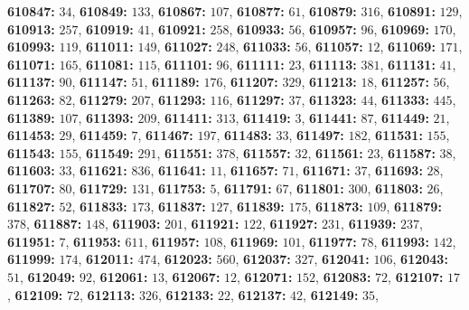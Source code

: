 \textsf{\bfseries 610847:} $34$, \textsf{\bfseries 610849:} $133$, \textsf{\bfseries 610867:} $107$, \textsf{\bfseries 610877:} $61$, \textsf{\bfseries 610879:} $316$, \textsf{\bfseries 610891:} $129$, \textsf{\bfseries 610913:} $257$, \textsf{\bfseries 610919:} $41$, \textsf{\bfseries 610921:} $258$, \textsf{\bfseries 610933:} $56$, \textsf{\bfseries 610957:} $96$, \textsf{\bfseries 610969:} $170$, \textsf{\bfseries 610993:} $119$, \textsf{\bfseries 611011:} $149$, \textsf{\bfseries 611027:} $248$, \textsf{\bfseries 611033:} $56$, \textsf{\bfseries 611057:} $12$, \textsf{\bfseries 611069:} $171$, \textsf{\bfseries 611071:} $165$, \textsf{\bfseries 611081:} $115$, \textsf{\bfseries 611101:} $96$, \textsf{\bfseries 611111:} $23$, \textsf{\bfseries 611113:} $381$, \textsf{\bfseries 611131:} $41$, \textsf{\bfseries 611137:} $90$, \textsf{\bfseries 611147:} $51$, \textsf{\bfseries 611189:} $176$, \textsf{\bfseries 611207:} $329$, \textsf{\bfseries 611213:} $18$, \textsf{\bfseries 611257:} $56$, \textsf{\bfseries 611263:} $82$, \textsf{\bfseries 611279:} $207$, \textsf{\bfseries 611293:} $116$, \textsf{\bfseries 611297:} $37$, \textsf{\bfseries 611323:} $44$, \textsf{\bfseries 611333:} $445$, \textsf{\bfseries 611389:} $107$, \textsf{\bfseries 611393:} $209$, \textsf{\bfseries 611411:} $313$, \textsf{\bfseries 611419:} $3$, \textsf{\bfseries 611441:} $87$, \textsf{\bfseries 611449:} $21$, \textsf{\bfseries 611453:} $29$, \textsf{\bfseries 611459:} $7$, \textsf{\bfseries 611467:} $197$, \textsf{\bfseries 611483:} $33$, \textsf{\bfseries 611497:} $182$, \textsf{\bfseries 611531:} $155$, \textsf{\bfseries 611543:} $155$, \textsf{\bfseries 611549:} $291$, \textsf{\bfseries 611551:} $378$, \textsf{\bfseries 611557:} $32$, \textsf{\bfseries 611561:} $23$, \textsf{\bfseries 611587:} $38$, \textsf{\bfseries 611603:} $33$, \textsf{\bfseries 611621:} $836$, \textsf{\bfseries 611641:} $11$, \textsf{\bfseries 611657:} $71$, \textsf{\bfseries 611671:} $37$, \textsf{\bfseries 611693:} $28$, \textsf{\bfseries 611707:} $80$, \textsf{\bfseries 611729:} $131$, \textsf{\bfseries 611753:} $5$, \textsf{\bfseries 611791:} $67$, \textsf{\bfseries 611801:} $300$, \textsf{\bfseries 611803:} $26$, \textsf{\bfseries 611827:} $52$, \textsf{\bfseries 611833:} $173$, \textsf{\bfseries 611837:} $127$, \textsf{\bfseries 611839:} $175$, \textsf{\bfseries 611873:} $109$, \textsf{\bfseries 611879:} $378$, \textsf{\bfseries 611887:} $148$, \textsf{\bfseries 611903:} $201$, \textsf{\bfseries 611921:} $122$, \textsf{\bfseries 611927:} $231$, \textsf{\bfseries 611939:} $237$, \textsf{\bfseries 611951:} $7$, \textsf{\bfseries 611953:} $611$, \textsf{\bfseries 611957:} $108$, \textsf{\bfseries 611969:} $101$, \textsf{\bfseries 611977:} $78$, \textsf{\bfseries 611993:} $142$, \textsf{\bfseries 611999:} $174$, \textsf{\bfseries 612011:} $474$, \textsf{\bfseries 612023:} $560$, \textsf{\bfseries 612037:} $327$, \textsf{\bfseries 612041:} $106$, \textsf{\bfseries 612043:} $51$, \textsf{\bfseries 612049:} $92$, \textsf{\bfseries 612061:} $13$, \textsf{\bfseries 612067:} $12$, \textsf{\bfseries 612071:} $152$, \textsf{\bfseries 612083:} $72$, \textsf{\bfseries 612107:} $17$, \textsf{\bfseries 612109:} $72$, \textsf{\bfseries 612113:} $326$, \textsf{\bfseries 612133:} $22$, \textsf{\bfseries 612137:} $42$, \textsf{\bfseries 612149:} $35$, 

